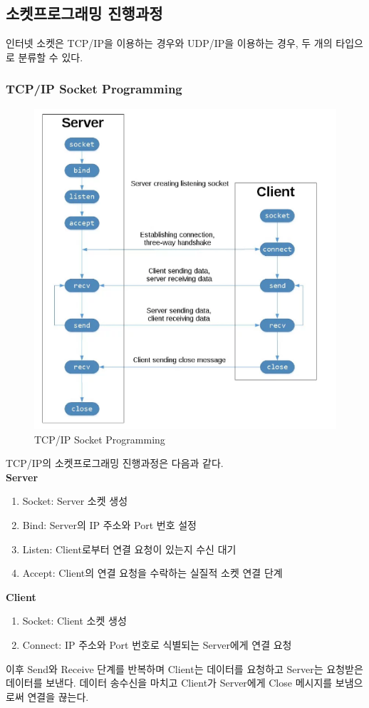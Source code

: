 \begin{multicols}{2}
\subsection{소켓프로그래밍 진행과정}    
    인터넷 소켓은 TCP/IP을 이용하는 경우와 UDP/IP을 이용하는 경우, 두 개의 타입으로 분류할 수 있다.
    
    \subsubsection*{TCP/IP Socket Programming}
    \vspace{-4mm}
    \begin{figure}[!h]\centering
		\includegraphics[width=.65\textwidth]{image/week07/1-3.png}
		\caption{\small TCP/IP Socket Programming}
		\vspace{-10pt}
    \end{figure}
    TCP/IP의 소켓프로그래밍 진행과정은 다음과 같다. \\
    \textbf{Server}
    \begin{enumerate}
        \item Socket: Server 소켓 생성
        \item Bind: Server의 IP 주소와 Port 번호 설정
        \item Listen: Client로부터 연결 요청이 있는지 수신 대기
        \item Accept: Client의 연결 요청을 수락하는 실질적 소켓 연결 단계
    \end{enumerate}
    
    \textbf{Client}
    \begin{enumerate}
        \item Socket: Client 소켓 생성
        \item Connect: IP 주소와 Port 번호로 식별되는 Server에게 연결 요청
    \end{enumerate}
    이후 Send와 Receive 단계를 반복하며 Client는 데이터를 요청하고 Server는 요청받은 데이터를 보낸다. 데이터 송수신을 마치고 Client가 Server에게 Close 메시지를 보냄으로써 연결을 끊는다.
    

\end{multicols}
